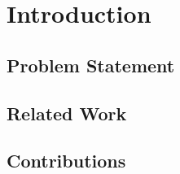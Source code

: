 \chapter{Introduction}

\blindtext

\section{Problem Statement}

\blindtext

\section{Related Work}

\blindtext

\section{Contributions}

\blindtext